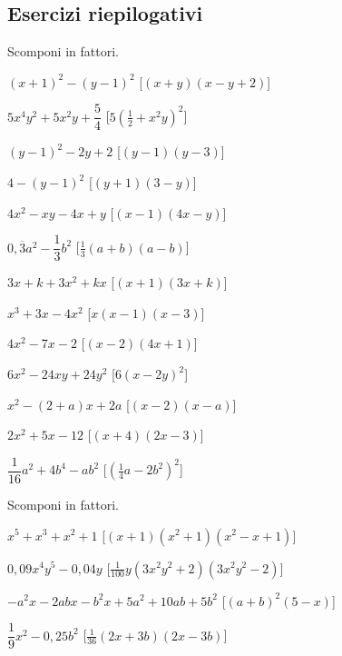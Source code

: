 \subsection{Esercizi riepilogativi}

\begin{esercizio}[\Ast]
 \label{ese:17.19}
 Scomponi in fattori.
 \begin{multicols}{2}
 \begin{enumeratea}
 \item $(x+1)^{2}-(y-1)^{2}$ \hfill [$(x+y)\left(x-y+2\right)$]
\item $5x^{4}y^{2}+5x^{2}y+\dfrac{5}{4}$ 
 \hfill [$5\left(\frac{1}{2}+x^{2}y\right)^{2}$]
\item $(y-1)^{2}-2y+2$ \hfill [$(y-1)\left(y-3\right)$]
\item $4-(y-1)^{2}$ \hfill [$(y+1)\left(3-y\right)$]
\item $4x^{2}-xy-4x+y$ \hfill [$(x-1)\left(4x-y\right)$]
\item $0,\overline{{3}}a^{2}-\dfrac{1}{3}b^{2}$ 
 \hfill [$\frac{1}{3}(a+b)\left(a-b\right)$]
\item $3x+k+3x^{2}+kx$ \hfill [$(x+1)\left(3x+k\right)$]
\item $x^{3}+3x-4x^{2}$ \hfill [$x(x-1)\left(x-3\right)$]
\item $4x^{2}-7x-2$ \hfill [$(x-2)\left(4x+1\right)$]
\item $6x^{2}-24xy+24y^{2}$ \hfill [$6\left(x-2y\right)^{2}$]
\item $x^{2}-(2+a)x+2a$
  \hfill [$(x-2)\left(x-a\right)$]
\item $2x^{2}+5x-12$
  \hfill [$(x+4)\left(2x-3\right)$]
\item $\dfrac{1}{16}a^{2}+4b^{4}-ab^{2}$
  \hfill [$\left(\frac{1}{4}a-2b^{2}\right)^{2}$]
 \end{enumeratea}
 \end{multicols}
\end{esercizio}

\newpage %

\begin{esercizio}[\Ast]
 \label{ese:17.20}
 Scomponi in fattori.
 \begin{enumeratea}
\item $x^{5}+x^{3}+x^{2}+1$
  \hfill [$(x+1)\left(x^{2}+1\right)\left(x^{2}-x+1\right)$]
\item $0,09x^{4}y^{5}-0,04y$
  \hfill [$\frac{1}{100}y\left(3x^{2}y^{2}+2\right)\left(3x^{2}y^{2}-2\right)$]
\item $-a^{2}x-2{abx}-b^{2}x+5a^{2}+10{ab}+5b^{2}$
  \hfill [$(a+b)^{2}\left(5-x\right)$]
\item $\dfrac{1}{9}x^{2}-0,25b^{2}$
  \hfill [$\frac{1}{36}(2x+3b)\left(2x-3b\right)$]
 \end{enumeratea}
\end{esercizio}

